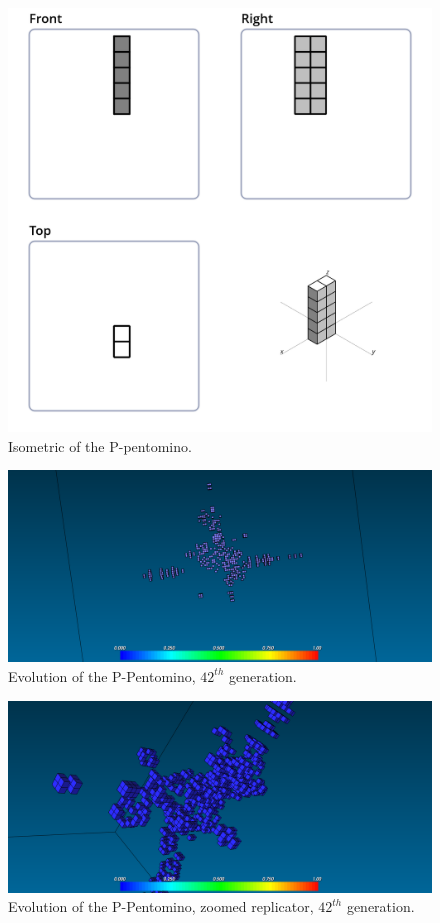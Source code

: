 \begin{figure}
	\centering
	\includegraphics[scale=0.3]{iso_diagrams/o.png}
	\caption{Isometric of the P-pentomino.}
  \label{fig:iso-pent-p}
\end{figure}


\begin{figure}
	\centering
	\includegraphics[scale=0.3]{pentominoes_ss/p_42.png}
	\caption{Evolution of the P-Pentomino, $42^{th}$ generation.}
  \label{fig:ss-pent:p-42}
\end{figure}

\begin{figure}
	\centering
	\includegraphics[scale=0.3]{pentominoes_ss/p_42_puffer.png}
	\caption{Evolution of the P-Pentomino, zoomed replicator, $42^{th}$
	generation.}
  \label{fig:ss-pent:p-42-puffer}
\end{figure}

